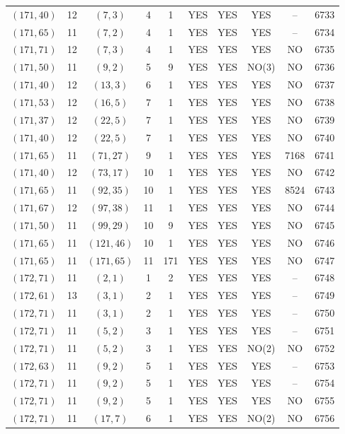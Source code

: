 \begin{longtable}{|c|c|c|c|c|c|c|c|c|c|}
$(171, 40)$ & 12 & $(7, 3)$ & 4 & 1 & YES & YES & YES & -- & 6733\\
$(171, 65)$ & 11 & $(7, 2)$ & 4 & 1 & YES & YES & YES & -- & 6734\\
$(171, 71)$ & 12 & $(7, 3)$ & 4 & 1 & YES & YES & YES & NO & 6735\\
$(171, 50)$ & 11 & $(9, 2)$ & 5 & 9 & YES & YES & NO(3) & NO & 6736\\
$(171, 40)$ & 12 & $(13, 3)$ & 6 & 1 & YES & YES & YES & NO & 6737\\
$(171, 53)$ & 12 & $(16, 5)$ & 7 & 1 & YES & YES & YES & NO & 6738\\
$(171, 37)$ & 12 & $(22, 5)$ & 7 & 1 & YES & YES & YES & NO & 6739\\
$(171, 40)$ & 12 & $(22, 5)$ & 7 & 1 & YES & YES & YES & NO & 6740\\
$(171, 65)$ & 11 & $(71, 27)$ & 9 & 1 & YES & YES & YES & 7168 & 6741\\
$(171, 40)$ & 12 & $(73, 17)$ & 10 & 1 & YES & YES & YES & NO & 6742\\
$(171, 65)$ & 11 & $(92, 35)$ & 10 & 1 & YES & YES & YES & 8524 & 6743\\
$(171, 67)$ & 12 & $(97, 38)$ & 11 & 1 & YES & YES & YES & NO & 6744\\
$(171, 50)$ & 11 & $(99, 29)$ & 10 & 9 & YES & YES & YES & NO & 6745\\
$(171, 65)$ & 11 & $(121, 46)$ & 10 & 1 & YES & YES & YES & NO & 6746\\
$(171, 65)$ & 11 & $(171, 65)$ & 11 & 171 & YES & YES & YES & NO & 6747\\
$(172, 71)$ & 11 & $(2, 1)$ & 1 & 2 & YES & YES & YES & -- & 6748\\
$(172, 61)$ & 13 & $(3, 1)$ & 2 & 1 & YES & YES & YES & -- & 6749\\
$(172, 71)$ & 11 & $(3, 1)$ & 2 & 1 & YES & YES & YES & -- & 6750\\
$(172, 71)$ & 11 & $(5, 2)$ & 3 & 1 & YES & YES & YES & -- & 6751\\
$(172, 71)$ & 11 & $(5, 2)$ & 3 & 1 & YES & YES & NO(2) & NO & 6752\\
$(172, 63)$ & 11 & $(9, 2)$ & 5 & 1 & YES & YES & YES & -- & 6753\\
$(172, 71)$ & 11 & $(9, 2)$ & 5 & 1 & YES & YES & YES & -- & 6754\\
$(172, 71)$ & 11 & $(9, 2)$ & 5 & 1 & YES & YES & YES & NO & 6755\\
$(172, 71)$ & 11 & $(17, 7)$ & 6 & 1 & YES & YES & NO(2) & NO & 6756\\

\end{longtable}
